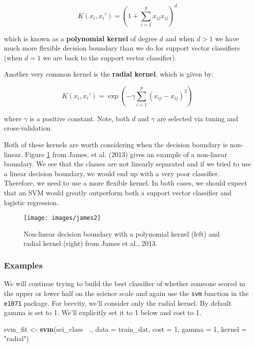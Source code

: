 \documentclass[]{book}
\newenvironment{Shaded}{\begin{snugshade}}{\end{snugshade}}
\newcommand{\DataTypeTok}[1]{\textcolor[rgb]{0.13,0.29,0.53}{#1}}
\newcommand{\DecValTok}[1]{\textcolor[rgb]{0.00,0.00,0.81}{#1}}
\newcommand{\KeywordTok}[1]{\textcolor[rgb]{0.13,0.29,0.53}{\textbf{#1}}}
\newcommand{\NormalTok}[1]{#1}
\newcommand{\OperatorTok}[1]{\textcolor[rgb]{0.81,0.36,0.00}{\textbf{#1}}}
\newcommand{\StringTok}[1]{\textcolor[rgb]{0.31,0.60,0.02}{#1}}
\begin{document}
\[
K(x_i, x_i') = (1 + \sum_{i = 1}^p x_{ij}x_{ij})^d
\]

which is known as a \textbf{polynomial kernel} of degree \(d\) and when \(d > 1\) we have much more flexible decision boundary than we do for support vector classifiers (when \(d = 1\) we are back to the support vector classifier).

Another very common kernel is the \textbf{radial kernel}, which is given by:

\[
K(x_i, x_i') = \exp\left(-\gamma \sum_{i = 1}^p (x_{ij} - x_{ij})^2\right)
\]

where \(\gamma\) is a positive constant. Note, both \(d\) and \(\gamma\) are selected via tuning and cross-validation.

Both of these kernels are worth considering when the decision boundary is non-linear. Figure \ref{fig:james2} from James, et al. (2013) gives an example of a non-linear boundary. We see that the classes are not linearly separated and if we tried to use a linear decision boundary, we would end up with a very poor classifier. Therefore, we need to use a more flexible kernel. In both cases, we should expect that an SVM would greatly outperform both a support vector classifier and logistic regression.

\begin{figure}
\texttt{[image: images/james2]} \caption{Non-linear decision boundary with a polynomial kernel (left) and radial kernel (right) from James et al., 2013.}\label{fig:james2}
\end{figure}

\hypertarget{examples}{%
\subsubsection{Examples}\label{examples}}

We will continue trying to build the best classifier of whether someone scored in the upper or lower half on the science scale and again use the \texttt{svm} function in the \texttt{e1071} package. For brevity, we'll consider only the radial kernel. By default gamma is set to 1. We'll explicitly set it to 1 below and cost to 1.

\begin{Shaded}
\begin{Highlighting}[]
\NormalTok{svm_fit <-}\StringTok{ }\KeywordTok{svm}\NormalTok{(sci_class }\OperatorTok{~}\NormalTok{., }\DataTypeTok{data =}\NormalTok{ train_dat,}
               \DataTypeTok{cost =} \DecValTok{1}\NormalTok{,}
               \DataTypeTok{gamma =} \DecValTok{1}\NormalTok{, }
               \DataTypeTok{kernel =} \StringTok{"radial"}\NormalTok{)}
\end{Highlighting}
\end{Shaded}
\end{document}
